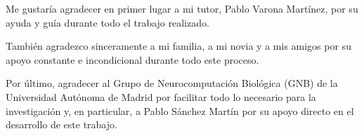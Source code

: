 
Me gustaría agradecer en primer lugar a mi tutor, Pablo Varona Martínez, por su ayuda y guía durante todo el trabajo realizado.

También agradezco sinceramente a mi familia, a mi novia y a mis amigos por su apoyo constante e incondicional durante todo este proceso.

Por último, agradecer al Grupo de Neurocomputación Biológica (GNB) de la Universidad Autónoma de Madrid por facilitar todo lo necesario para la investigación y, en particular, a Pablo Sánchez Martín por su apoyo directo en el desarrollo de este trabajo.
